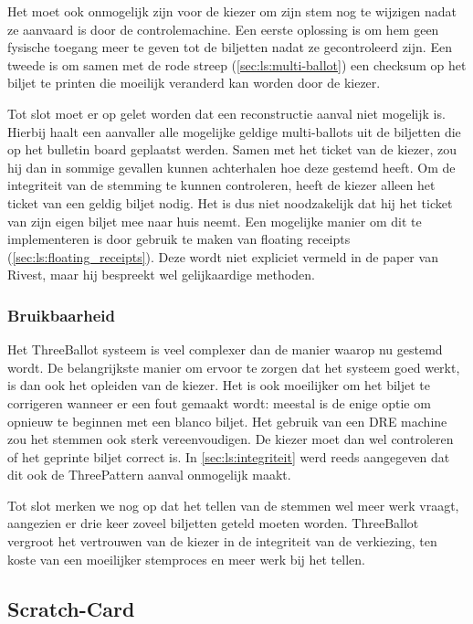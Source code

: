 \npar Het moet ook onmogelijk zijn voor de kiezer om zijn stem nog te wijzigen nadat ze aanvaard is door de controlemachine. Een eerste oplossing is om hem geen fysische toegang meer te geven tot de biljetten nadat ze gecontroleerd zijn. Een tweede is om samen met de rode streep (\ref{sec:ls:multi-ballot}) een checksum op het biljet te printen die moeilijk veranderd kan worden door de kiezer.

\npar Tot slot moet er op gelet worden dat een reconstructie aanval niet mogelijk is. Hierbij haalt een aanvaller alle mogelijke geldige multi-ballots uit de biljetten die op het bulletin board geplaatst werden. Samen met het ticket van de kiezer, zou hij dan in sommige gevallen kunnen achterhalen hoe deze gestemd heeft. Om de integriteit van de stemming te kunnen controleren, heeft de kiezer alleen het ticket van een geldig biljet nodig. Het is dus niet noodzakelijk dat hij het ticket van zijn eigen biljet mee naar huis neemt. Een mogelijke manier om dit te implementeren is door gebruik te maken van floating receipts (\ref{sec:ls:floating_receipts}). Deze wordt niet expliciet vermeld in de paper van Rivest, maar hij bespreekt wel gelijkaardige methoden.\cite{rivest_threeballot}

\subsubsection{Bruikbaarheid}

Het ThreeBallot systeem is veel complexer dan de manier waarop nu gestemd wordt. De belangrijkste manier om ervoor te zorgen dat het systeem goed werkt, is dan ook het opleiden van de kiezer. Het is ook moeilijker om het biljet te corrigeren wanneer er een fout gemaakt wordt: meestal is de enige optie om opnieuw te beginnen met een blanco biljet. Het gebruik van een DRE machine zou het stemmen ook sterk vereenvoudigen. De kiezer moet dan wel controleren of het geprinte biljet correct is. In \ref{sec:ls:integriteit} werd reeds aangegeven dat dit ook de ThreePattern aanval onmogelijk maakt.

\npar Tot slot merken we nog op dat het tellen van de stemmen wel meer werk vraagt, aangezien er drie keer zoveel biljetten geteld moeten worden. ThreeBallot vergroot het vertrouwen van de kiezer in de integriteit van de verkiezing, ten koste van een moeilijker stemproces en meer werk bij het tellen.

\subsection{Scratch-Card}
\label{sec:ls:scratch_card}

